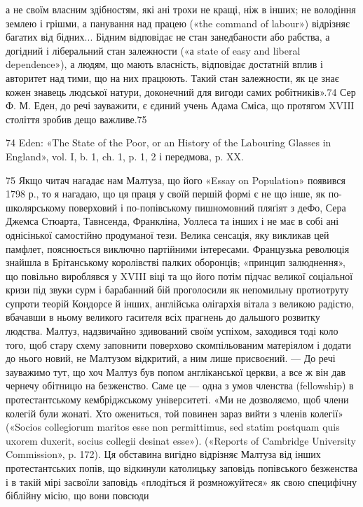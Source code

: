 а не своїм власним здібностям, які ані трохи не кращі, ніж в
інших; не володіння землею і грішми, а панування над працею
(«the command of labour») відрізняє багатих від бідних... Бідним
відповідає не стан занедбаности або рабства, а догідний і
ліберальний стан залежности («а state of easy and liberal dependence»),
а людям, що мають власність, відповідає достатній вплив
і авторитет над тими, що на них працюють. Такий стан залежности,
як це знає кожен знавець людської натури, доконечний
для вигоди самих робітників».74 Сер Ф. М. Еден, до речі зауважити,
є єдиний учень Адама Сміса, що протягом XVIIІ століття
зробив дещо важливе.75

74    Eden: «The State of the Poor, or an History of the Labouring Glasses
in England», vol. I, b. 1, ch. 1, p. 1, 2 і передмова, p. XX.

75    Якщо читач нагадає нам Малтуза, що його «Essay on Population»
появився 1798 р., то я нагадаю, що ця праця у своїй першій формі є не
що інше, як по-школярському поверховий і по-попівському пишномовний
пляґіят з деФо, Сера Джемса Стюарта, Тавнсенда, Франкліна, Уоллеса
та інших і не має в собі ані однісінької самостійно продуманої тези. Велика
сенсація, яку викликав цей памфлет, пояснюється виключно партійними
інтересами. Французька революція знайшла в Брітанському королівстві
палких оборонців; «принцип залюднення», що повільно вироблявся у
XVIII віці та що його потім підчас великої соціальної кризи під звуки
сурм і барабанний бій проголосили як непомильну протиотруту супроти
теорій Кондорсе й інших, англійська олігархія вітала з великою радістю,
вбачавши в ньому великого гасителя всіх прагнень до дальшого розвитку
людства. Малтуз, надзвичайно здивований своїм успіхом, заходився тоді
коло того, щоб стару схему заповнити поверхово скомпільованим матеріялом
і додати до нього новий, не Малтузом відкритий, а ним лише
присвоєний. — До речі зауважимо тут, що хоч Малтуз був попом англіканської
церкви, а все ж він дав чернечу обітницю на безженство.
Саме це — одна з умов членства (fellowship) в протестантському кембріджському
університеті. «Ми не дозволяємо, щоб члени колегій були
жонаті. Хто ожениться, той повинен зараз вийти з членів колегії» («Socios
collegiorum maritos esse non permittimus, sed statim postquam quis
uxorem duxerit, socius collegii desinat esse»). («Reports of Cambridge University
Commission», p. 172). Ця обставина вигідно відрізняє Малтуза
від інших протестантських попів, що відкинули католицьку заповідь
попівського безженства і в такій мірі засвоїли заповідь «плодіться й
розмножуйтеся» як свою специфічну біблійну місію, що вони повсюди
